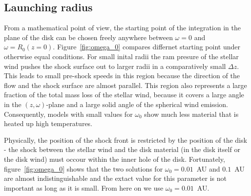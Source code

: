 \subsection{Launching radius}
From a mathematical point of view, the starting point of the integration in the plane of the disk can be chosen freely anywhere between $\omega=0$ and $\omega=R_0(z=0)$. Figure~\ref{fig:omega_0} compares differnet starting point under otherwise equal conditions. For small inital radii the ram presure of the stellar wind pushes the shock surface out to larger radii in a comparatively small $\Delta z$. This leads to small pre-shock speeds in this region because the direction of the flow and the shock surface are almost parallel. This region also represents a large fraction of the total mass loss of the stellar wind, because it covers a large angle in the $(z,\omega)$-plane and a large solid angle of the spherical wind emission. Consequently, models with small values for $\omega_0$ show much less material that is heated up high temperatures. 

Physically, the position of the shock front is restricted by the position of the disk - the shock between the stellar wind and the disk material (in the disk itself or the disk wind) must occour within the inner hole of the disk. Fortunately, figure~\ref{fig:omega_0} shows that the two solutions for $\omega_0=0.01$~AU and $0.1$~AU are almost indistinguishable and the extact value for this parameter is not important as long as it is small. From here on we use $\omega_0 = 0.01$~AU.
